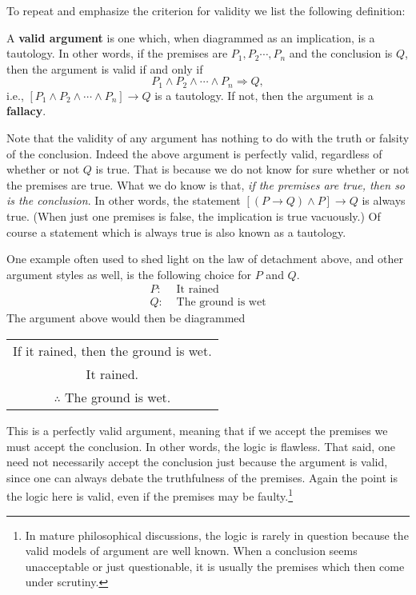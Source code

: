 To repeat and emphasize
the criterion for validity we list the following definition:
\begin{definition}
A {\bf valid argument} is one which, when diagrammed as an implication,
is a tautology.  In other words, if the premises are
$P_1,P_2\cdots,P_n$ and the conclusion is $Q$, then the argument
is valid if and only if 
$$P_1\wedge P_2\wedge\cdots\wedge P_n\Longrightarrow Q,$$
i.e., $\left[P_1\wedge P_2\wedge\cdots\wedge P_n\right]\longrightarrow
Q$ is a tautology.
If not, then the argument is a {\bf fallacy}.
\end{definition}

Note that the validity of any argument has nothing to do with
the truth or falsity of the conclusion.  Indeed the above argument
is perfectly valid, regardless of whether or not $Q$ is true.
That is because we do not know for sure whether or not the 
premises are true.  What we do know is that, {\it if the premises
are true, then so is the conclusion}.  In other words, the statement
$[(P\rightarrow Q)\wedge P]\longrightarrow Q$ is always true.
(When just one  premises is false, the implication is true vacuously.)
Of course a statement which is always true is also known as a 
tautology.

One example often used to shed light on the law of 
detachment above, and other argument styles as well, is the
following choice for $P$ and $Q$.
\begin{align*}
P:&\text{ It rained}\\
Q:&\text{ The ground is wet}
\end{align*} 
The argument above would then be diagrammed
\begin{center}
\begin{tabular}{c}
If it rained, then the ground is wet.\\
It rained.\\
\hline
$\therefore$ The ground is wet.
\end{tabular}
\end{center}
This is a perfectly valid argument, meaning that if we accept the premises
we must accept the conclusion. In other words, the logic is flawless.
That said, one need not necessarily accept the conclusion
just because the argument is valid, since one can
always debate the truthfulness of the premises.
Again the point is the logic here is valid, even if the premises 
may be faulty.\footnote{%
In mature philosophical discussions, the logic is rarely in question because
the valid models of argument are well known.  When a conclusion
seems unacceptable or just questionable, 
it is usually the premises which then come under scrutiny.
}

